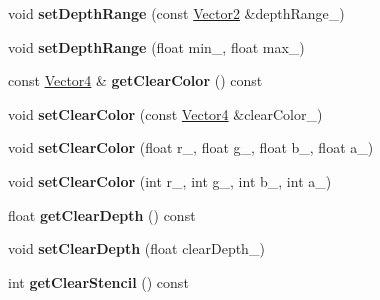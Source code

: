 \begin{DoxyCompactItemize}
\item 
void {\bfseries set\+Depth\+Range} (const \hyperlink{class_magnum_1_1_vector2}{Vector2} \&depth\+Range\+\_\+)\hypertarget{class_magnum_1_1_g_x_context_a6f0e057916a656461647ff330dc71a4a}{}\label{class_magnum_1_1_g_x_context_a6f0e057916a656461647ff330dc71a4a}

\item 
void {\bfseries set\+Depth\+Range} (float min\+\_\+, float max\+\_\+)\hypertarget{class_magnum_1_1_g_x_context_a4763b1959d84d92446880c2ff45a659a}{}\label{class_magnum_1_1_g_x_context_a4763b1959d84d92446880c2ff45a659a}

\item 
const \hyperlink{class_magnum_1_1_vector4}{Vector4} \& {\bfseries get\+Clear\+Color} () const \hypertarget{class_magnum_1_1_g_x_context_ab9375a8421a7b455ef976df96d44ec38}{}\label{class_magnum_1_1_g_x_context_ab9375a8421a7b455ef976df96d44ec38}

\item 
void {\bfseries set\+Clear\+Color} (const \hyperlink{class_magnum_1_1_vector4}{Vector4} \&clear\+Color\+\_\+)\hypertarget{class_magnum_1_1_g_x_context_a9238232c9d1d243930f35bed59a2c5eb}{}\label{class_magnum_1_1_g_x_context_a9238232c9d1d243930f35bed59a2c5eb}

\item 
void {\bfseries set\+Clear\+Color} (float r\+\_\+, float g\+\_\+, float b\+\_\+, float a\+\_\+)\hypertarget{class_magnum_1_1_g_x_context_a14fba60878def7efcd65a996f08fe6db}{}\label{class_magnum_1_1_g_x_context_a14fba60878def7efcd65a996f08fe6db}

\item 
void {\bfseries set\+Clear\+Color} (int r\+\_\+, int g\+\_\+, int b\+\_\+, int a\+\_\+)\hypertarget{class_magnum_1_1_g_x_context_a30e4d804bd3efd71b8a5805ab44df135}{}\label{class_magnum_1_1_g_x_context_a30e4d804bd3efd71b8a5805ab44df135}

\item 
float {\bfseries get\+Clear\+Depth} () const \hypertarget{class_magnum_1_1_g_x_context_a3e81c982d218564e62a48cdb129ed2c2}{}\label{class_magnum_1_1_g_x_context_a3e81c982d218564e62a48cdb129ed2c2}

\item 
void {\bfseries set\+Clear\+Depth} (float clear\+Depth\+\_\+)\hypertarget{class_magnum_1_1_g_x_context_a04777c1bf6b4b617ddd711685da73bfe}{}\label{class_magnum_1_1_g_x_context_a04777c1bf6b4b617ddd711685da73bfe}

\item 
int {\bfseries get\+Clear\+Stencil} () const \hypertarget{class_magnum_1_1_g_x_context_a58166ef8fe8aff1b96bc387935730c37}{}\label{class_magnum_1_1_g_x_context_a58166ef8fe8aff1b96bc387935730c37}


\end{DoxyCompactItemize}

